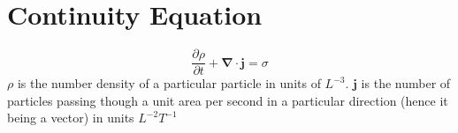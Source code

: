 \documentclass[a5paper,12pt]{article}
\begin{document}

\clearpage
\tableofcontents
\listoftables
\listoffigures
\clearpage

\section{Continuity Equation}
\begin{equation}
\frac{\partial \rho}{\partial t}+\mathbf{\nabla}\cdot\mathbf{j}=\sigma
\end{equation}
$\rho$ is the number density of a particular particle in units of $L^{-3}$.
$\mathbf{j}$ is  the number of particles passing though a unit area per second in a particular direction (hence it being a vector) in units $L^{-2}T^{-1}$
\clearpage
{}
\printindex
\end{document}
